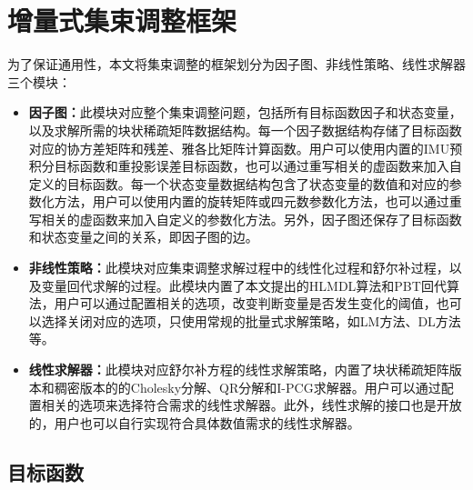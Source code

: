 \section{增量式集束调整框架}\label{sec:framework}

为了保证通用性，本文将集束调整的框架划分为因子图、非线性策略、线性求解器三个模块：
\begin{itemize}
    \item \textbf{因子图：}此模块对应整个集束调整问题，包括所有目标函数因子和状态变量，以及求解所需的块状稀疏矩阵数据结构。每一个因子数据结构存储了目标函数对应的协方差矩阵和残差、雅各比矩阵计算函数。用户可以使用内置的IMU预积分目标函数和重投影误差目标函数，也可以通过重写相关的虚函数来加入自定义的目标函数。每一个状态变量数据结构包含了状态变量的数值和对应的参数化方法，用户可以使用内置的旋转矩阵或四元数参数化方法，也可以通过重写相关的虚函数来加入自定义的参数化方法。另外，因子图还保存了目标函数和状态变量之间的关系，即因子图的边。
    \item \textbf{非线性策略：}此模块对应集束调整求解过程中的线性化过程和舒尔补过程，以及变量回代求解的过程。此模块内置了本文提出的HLMDL算法和PBT回代算法，用户可以通过配置相关的选项，改变判断变量是否发生变化的阈值，也可以选择关闭对应的选项，只使用常规的批量式求解策略，如LM方法、DL方法等。
    \item \textbf{线性求解器：}此模块对应舒尔补方程的线性求解策略，内置了块状稀疏矩阵版本和稠密版本的的Cholesky分解、QR分解和I-PCG求解器。用户可以通过配置相关的选项来选择符合需求的线性求解器。此外，线性求解的接口也是开放的，用户也可以自行实现符合具体数值需求的线性求解器。
\end{itemize}

\subsection{目标函数}


